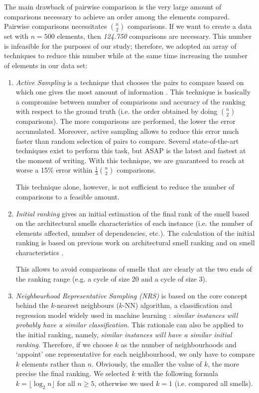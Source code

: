 The main drawback of pairwise comparison is the very large amount of comparisons necessary to achieve an order among the elements compared.
Pairwise comparisons necessitates $\binom{n}{2}$ comparisons. If we want to create a data set with $n = 500$ elements, then \emph{124.750} comparisons are necessary.
This number is infeasible for the purposes of our study; therefore, we adopted an array of techniques to reduce this number while at the same time increasing the number of elements in our data set:
\begin{enumerate}
    
    \item \emph{Active Sampling} is a technique that chooses the pairs to compare based on which one gives the most amount of information \cite{Mikhailiuk2020}. This technique is basically a compromise between number of comparisons and accuracy of the ranking with respect to the ground truth (i.e. the order obtained by doing $\binom{n}{2}$ comparisons). 
    The more comparisons are performed, the lower the error accumulated.
    Moreover, active sampling allows to reduce this error much faster than random selection of pairs to compare. 
    Several state-of-the-art techniques exist to perform this task, but ASAP \cite{Mikhailiuk2020} is the latest and fastest at the moment of writing.
    With this technique, we are guaranteed to reach at worse a 15\% error within $\frac{1}{3}\binom{n}{2}$ comparisons.
    
    This technique alone, however, is not sufficient to reduce the number of comparisons to a feasible amount.

    \item \emph{Initial ranking} gives an initial estimation of the final rank of the smell based on the architectural smells characteristics of each instance (i.e. the number of elements affected, number of dependencies, etc.). 
    The calculation of the initial ranking is based on previous work on architectural smell ranking \cite{Laval2012} and on smell characteristics \cite{Sas2019}.
    
    This allows to avoid comparisons of smells that are clearly at the two ends of the ranking range (e.g. a cycle of size 20 and a cycle of size 3).

    \item \emph{Neighbourhood Representative Sampling (NRS)} is based on the core concept behind the $k$-nearest neighbours ($k$-NN) algorithm, a classification and regression model widely used in machine learning \cite{Fix1989}: \emph{similar instances will probably have a similar classification}.
    This rationale can also be applied to the initial ranking, namely, \emph{similar instances will have a similar initial ranking}.
    Therefore, if we choose $k$ as the number of neighbourhoods and `appoint' one representative for each neighbourhood, we only have to compare $k$ elements rather than $n$.
    Obviously, the smaller the value of $k$, the more precise the final ranking.
    We selected $k$ with the following formula $k = \lfloor\log_2 n\rfloor$ for all $n \ge 5$, otherwise we used $k = 1$ (i.e. compared all smells).


\end{enumerate}

